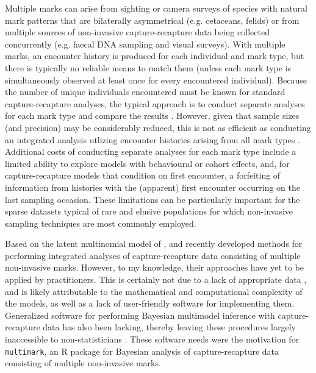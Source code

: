 \documentclass[12pt]{article}
\begin{document}
Multiple marks can arise from sighting or camera surveys of species with natural mark patterns that are bilaterally asymmetrical (e.g. cetaceans, felids) or from multiple sources of non-invasive capture-recapture data being collected concurrently (e.g. faecal DNA sampling and visual surveys). With multiple marks, an encounter history is produced for each individual and mark type, but there is typically no reliable means to match them (unless each mark type is simultaneously observed at least once for every encountered individual). Because the number of unique individuals encountered must be known for standard capture-recapture analyses, the typical approach is to conduct separate analyses for each mark type and compare the results \citep[e.g.][]{WilsonEtAl1999,BerrowEtAl2012,NairEtAl2012}. However, given that sample sizes (and precision) may be considerably reduced, this is not as efficient as conducting an integrated analysis utlizing encounter histories arising from all mark types \citep{McClintockEtAl2013a}. Additional costs of conducting separate analyses for each mark type include a limited ability to explore models with behavioural or cohort effects, and, for capture-recapture models that condition on first encounter, a forfeiting of information from histories with the (apparent) first encounter occurring on the last sampling occasion. These limitations can be particularly important for the sparse datasets typical of rare and elusive populations for which non-invasive sampling techniques are most commonly employed. 

Based on the latent multinomial model of \cite{LinkEtAl2010}, \cite{BonnerHolmberg2013} and \cite{McClintockEtAl2013a} recently developed methods for performing integrated analyses of capture-recapture data consisting of multiple non-invasive marks. However, to my knowledge, their approaches have yet to be applied by practitioners. This is certainly not due to a lack of appropriate data \citep[e.g.][]{WilsonEtAl1999,HolmbergEtAl2008,MadonEtAl2011,BerrowEtAl2012,NairEtAl2012}, and is likely attributable to the mathematical and computational complexity of the models, as well as a lack of user-friendly software for implementing them. Generalized software for performing Bayesian multimodel inference with capture-recapture data has also been lacking, thereby leaving these procedures largely inaccessible to non-statisticians \citep[e.g.][]{BrooksEtAl2000,DurbanElston2005,KingBrooks2008,Royle2008,McClintockEtAl2013a}. These software needs were the motivation for \verb|multimark|, an R \citep{RTeam2013} package for Bayesian analysis of capture-recapture data consisting of multiple non-invasive marks. 
\end{document}
